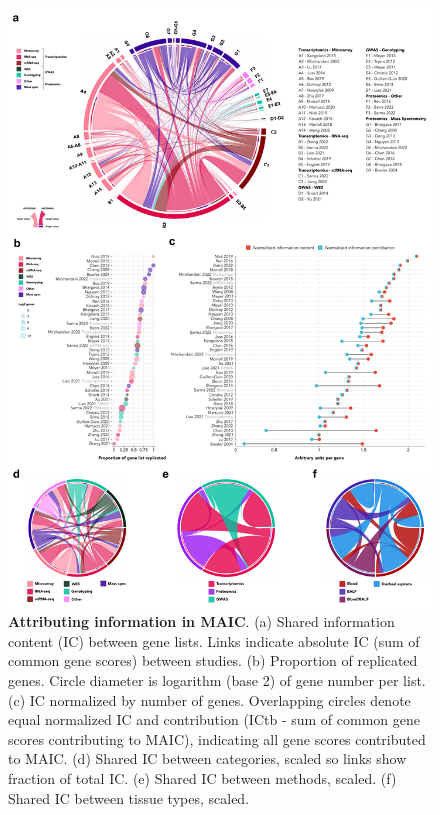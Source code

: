 \documentclass[
  11,
  a4paper,
]{article}
\begin{document}
\begin{figure}

{\centering \includegraphics{./img/Figure_2.png}

}

\caption{\label{fig-fig2}\textbf{Attributing information in MAIC}. (a)
Shared information content (IC) between gene lists. Links indicate
absolute IC (sum of common gene scores) between studies. (b) Proportion
of replicated genes. Circle diameter is logarithm (base 2) of gene
number per list. (c) IC normalized by number of genes. Overlapping
circles denote equal normalized IC and contribution (ICtb - sum of
common gene scores contributing to MAIC), indicating all gene scores
contributed to MAIC. (d) Shared IC between categories, scaled so links
show fraction of total IC. (e) Shared IC between methods, scaled. (f)
Shared IC between tissue types, scaled.}

\end{figure}
\end{document}
